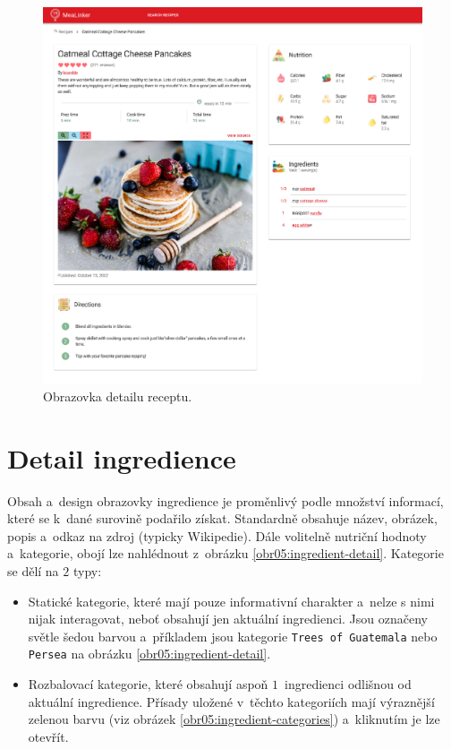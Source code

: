 \begin{figure}[h!]\centering
\includegraphics[width=140mm]{../img/recipe-detail}
\caption{Obrazovka detailu receptu.}
\label{obr05:recipe-detail}
\end{figure}

\section{Detail ingredience}

Obsah a~design obrazovky ingredience je proměnlivý podle množství informací, které se k~dané surovině podařilo získat. Standardně obsahuje název, obrázek, popis a~odkaz na zdroj (typicky Wikipedie). Dále volitelně nutriční hodnoty a~kategorie, obojí lze nahlédnout z~obrázku \ref{obr05:ingredient-detail}. Kategorie se dělí na $2$ typy:
\begin{itemize}
    \item Statické kategorie, které mají pouze informativní charakter a~nelze s nimi nijak interagovat, neboť obsahují jen aktuální ingredienci. Jsou označeny světle šedou barvou a~příkladem jsou kategorie \texttt{Trees of~Guatemala} nebo \texttt{Persea} na obrázku \ref{obr05:ingredient-detail}.
    \item Rozbalovací kategorie, které obsahují aspoň $1$~ingredienci odlišnou od aktuální ingredience. Přísady uložené v~těchto kategoriích mají výraznější zelenou barvu (viz obrázek \ref{obr05:ingredient-categories}) a~kliknutím je lze otevřít.
\end{itemize}

